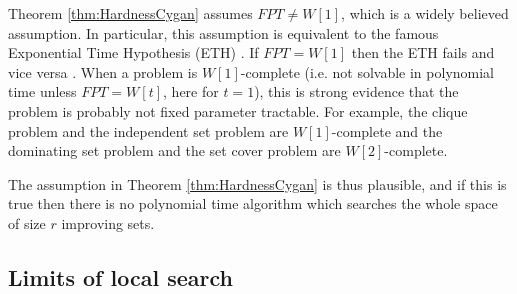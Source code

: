 Theorem \ref{thm:HardnessCygan} assumes $FPT \neq W[1]$, which is a widely believed assumption. In particular, this assumption is equivalent to the famous Exponential Time Hypothesis (ETH) \cite{ETH}. If $FPT = W[1]$ then the ETH fails and vice versa \cite{Cygan,FPT1}. When a problem is $W[1]$-complete (i.e. not solvable in polynomial time unless $FPT = W[t]$, here for $t=1$), this is strong evidence that the problem is probably not fixed parameter tractable. For example, %
the clique problem and the independent set problem are $W[1]$-complete and %
the dominating set problem and the set cover problem are $W[2]$-complete. %

The assumption in Theorem \ref{thm:HardnessCygan} is thus plausible, and if this is true then there is no polynomial time algorithm which searches the whole space of size $r$ improving sets.

\subsection{Limits of local search}\label{subsec:Hardness3}


